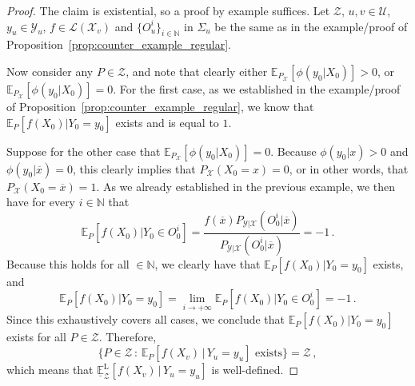 \documentclass[twoside,11pt]{article}
\newcommand{\nats}{\mathbb{N}}
\newcommand{\states}{\mathcal{X}}
\newcommand{\observs}{\mathcal{Y}}
\newcommand{\gambles}{\mathcal{L}}
\begin{document}
\begin{proof}
The claim is existential, so a proof by example suffices. Let $\mathcal{Z}$, $u,v\in\mathcal{U}$, $y_u\in\observs_u$, $f\in\gambles(\states_v)$ and $\{O_u^i\}_{i\in\nats}$ in $\Sigma_u$ be the same as in the example/proof of Proposition~\ref{prop:counter_example_regular}.

Now consider any $P\in\mathcal{Z}$, and note that clearly either $\mathbb{E}_{P_\states}[\phi(y_0\vert X_0)]>0$, or $\mathbb{E}_{P_\states}[\phi(y_0\vert X_0)]=0$. For the first case, as we established in the example/proof of Proposition~\ref{prop:counter_example_regular}, we know that $\mathbb{E}_P[f(X_0)\vert Y_0=y_0]$ exists and is equal to $1$.

Suppose for the other case that $\mathbb{E}_{P_\states}[\phi(y_0\vert X_0)]=0$. Because $\phi(y_0\vert x)>0$ and $\phi(y_0\vert \overline{x})=0$, this clearly implies that $P_\states(X_0=x)=0$, or in other words, that $P_\states(X_0=\overline{x})=1$. As we already established in the previous example, we then have for every $i\in\nats$ that
\begin{equation*}
\mathbb{E}_P[f(X_0)\vert Y_0\in O_0^i] = \frac{f(\overline{x})P_{\observs\vert\states}(O_0^i\vert \overline{x})}{P_{\observs\vert\states}(O_0^i\vert \overline{x})} = -1\,.
\end{equation*}
Because this holds for all $\in\nats$, we clearly have that $\mathbb{E}_P[f(X_0)\vert Y_0 = y_0]$ exists, and
\begin{equation*}
\mathbb{E}_P[f(X_0)\vert Y_0=y_0] = \lim_{i\to+\infty} \mathbb{E}_P[f(X_0)\vert Y_0\in O_0^i] = -1\,.
\end{equation*}
Since this exhaustively covers all cases, we conclude that $\mathbb{E}_P[f(X_0)\vert Y_0=y_0]$ exists for all $P\in\mathcal{Z}$. Therefore,
\begin{equation*}
\{P\in\mathcal{Z}\,:\,\text{$\mathbb{E}_P[f(X_v)\,\vert\,Y_u=y_u]$ exists}\} = \mathcal{Z}\,,
\end{equation*}
which means that $\underline{\mathbb{E}}_\mathcal{Z}^\mathrm{L}[f(X_v)\,\vert\, Y_u=y_u]$ is well-defined.


\end{proof}
\end{document}
